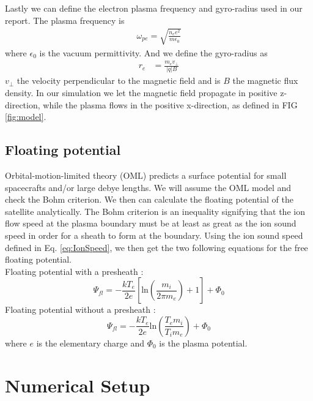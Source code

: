 \documentclass[aip, 
rsi, 
amsmath,
amssymb,
longbibliography,
preprint]{revtex4-1}
\begin{document}
Lastly we can define the electron plasma frequency and gyro-radius used in our report. The plasma frequency is
\begin{align}
\omega_{pe} = \sqrt{\frac{n_e e^2}{m \epsilon_0}}\label{plasmafreq}
\end{align}
where $\epsilon_0$ is the vacuum permittivity. And we define the gyro-radius as 
\begin{align}
r_e &= \frac{m_e v_\perp}{|q| B}\label{eq:gyroradius}
\end{align}
$v_\perp$ the velocity perpendicular to the magnetic field and is $B$ the magnetic flux density. In our simulation we let the magnetic field propagate in positive z-direction, while the plasma flows in the positive x-direction, as defined in FIG \ref{fig:model}.

\subsection{Floating potential}

Orbital-motion-limited theory (OML) predicts a surface potential for small spacecrafts and/or large debye lengths. We will assume the OML model and check the Bohm criterion. We then can calculate the floating potential of the satellite analytically. The Bohm criterion is an inequality signifying that the ion flow speed at the plasma boundary must be at least as great as the ion sound speed in order for a sheath to form at the boundary.  Using the ion sound speed defined in Eq. \ref{eq:IonSpeed}, we then get the two following equations for the free floating potential. \\

Floating potential with a presheath \cite{Boef}:
\begin{equation}\label{eq:Boef}
\Psi_{fl} = -\frac{k T_e}{2e}[\text{ln}(\frac{m_i}{2\pi m_e})+1]+\Phi_0
\end{equation}
Floating potential without a presheath \cite{Pesceli}:
\begin{equation}\label{eq:Pesceli}
\Psi_{fl}=-\frac{k T_e}{2e}\text{ln}(\frac{T_em_i}{T_i m_e})+\Phi_0
\end{equation}
where $e$ is the elementary charge and $\Phi_0$ is the plasma potential. \\

\section{\label{sec:numsetup} Numerical Setup}
\end{document}
